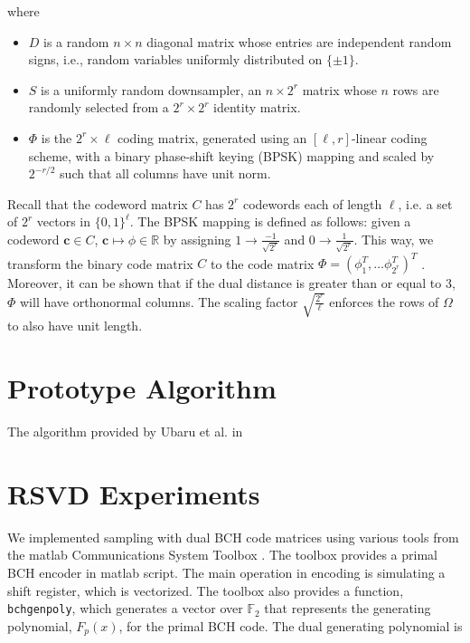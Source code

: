 \documentclass[12pt]{article}
\newcommand{\tbf}{\textbf}
\newcommand{\mB}{\mathbb}
\begin{document}
where 
\begin{itemize}
\item $D$ is a random $n \times n$ diagonal matrix whose entries are independent random signs, i.e., random variables uniformly distributed on $\{ \pm 1 \}$.

\item $S$ is a uniformly random downsampler, an $n \times 2^r$ matrix whose $n$ rows are randomly selected from a $2^r \times 2^r$ identity matrix.

\item $\Phi$ is the $2^r \times \ell$ coding matrix, generated using an $[ \ell, r]$-linear coding scheme, with a binary phase-shift keying (BPSK) mapping and scaled by $2^{-r/2}$ such that all columns have unit norm.

\end{itemize}
Recall that the codeword matrix $C$ has $2^r$ codewords each of length $\ell$, i.e. a set of $2^r$ vectors in $\{0,1\}^{\ell}$. The BPSK mapping is defined as follows: given a codeword $\tbf{c} \in C$, $\tbf{c} \mapsto \phi \in \mB{R}$ by assigning $1 \rightarrow \frac{-1}{\sqrt{2^r}}$ and $0 \rightarrow \frac{1}{\sqrt{2^r}}$. This way, we transform the binary code matrix $C$ to the code matrix $\Phi = (\phi_1^T,  \hdots \phi_{2^r}^T) ^T$ \cite{ubaru2015low}. Moreover, it can be shown that if the dual distance is greater than or equal to 3, $\Phi$ will have orthonormal columns. The scaling factor $\sqrt{\frac{2^r}{\ell}}$ enforces the rows of $\Omega$ to also have unit length.


\section{Prototype Algorithm}
The algorithm provided by Ubaru et al. in \cite{ubaru2015low} 


\section{RSVD Experiments}
We implemented sampling with dual BCH code matrices using various tools from the {\sc matlab} Communications System Toolbox \cite{matlab_cst_2015}.  The toolbox provides a primal BCH encoder in {\sc matlab} script.  The main operation in encoding is simulating a shift register, which is vectorized.  The toolbox also provides a function, \texttt{bchgenpoly}, which generates a vector over $\mathbb{F}_2$ that represents the generating polynomial, $F_p(x)$, for the primal BCH code.  The dual generating polynomial is 
\end{document}
